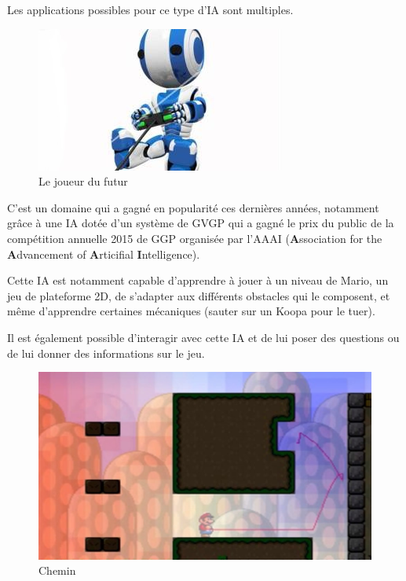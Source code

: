 \documentclass[a4paper, 12pt]{article} %
\begin{document}
Les applications possibles pour ce type d'IA sont multiples\cite{levine_et_al:DFU:2013:4337}.


\begin{figure}[!h]%
	\begin{center} 
		\includegraphics[width=0.60\columnwidth]{images/robotplaying.jpg}%
		\caption{Le joueur du futur}%
	\end{center}
\end{figure}

\newpage
C’est un domaine qui a gagné en popularité ces dernières années, notamment grâce à une IA dotée d’un système de GVGP qui a gagné le prix du public de la compétition annuelle 2015\cite{mariolives} de GGP organisée par l’AAAI (\textbf{A}ssociation for the \textbf{A}dvancement of \textbf{A}rticifial \textbf{I}ntelligence).

Cette IA est notamment capable d’apprendre à jouer à un niveau de Mario, un jeu de plateforme 2D, de s’adapter aux différents obstacles qui le composent, et même d’apprendre certaines mécaniques (sauter sur un Koopa pour le tuer).

Il est également possible d'interagir avec cette IA et de lui poser des questions ou de lui donner des informations sur le jeu.

\begin{figure}[!h]%
	\begin{center} 
		\includegraphics[width=0.60\columnwidth]{images/mario.jpg}%
		\caption{Chemin }%
	\end{center}
\end{figure}
\end{document}
